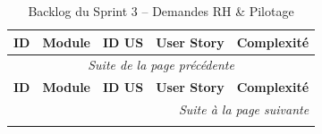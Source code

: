 
\begin{longtable}{|c|c|c|p{7.2cm}|c|}
\caption{Backlog du Sprint 3 -- Demandes RH \& Pilotage} \label{tab:backlog-sprint-3} \\
\hline
\textbf{ID} & \textbf{Module} & \textbf{ID US} & \textbf{User Story} & \textbf{Complexité} \\
\hline
\endfirsthead

\multicolumn{5}{c}{\textit{Suite de la page précédente}} \\
\hline
\textbf{ID} & \textbf{Module} & \textbf{ID US} & \textbf{User Story} & \textbf{Complexité} \\
\hline
\endhead

\hline \multicolumn{5}{r}{\textit{Suite à la page suivante}} \\
\endfoot

\hline
\endlastfoot


\end{longtable}
